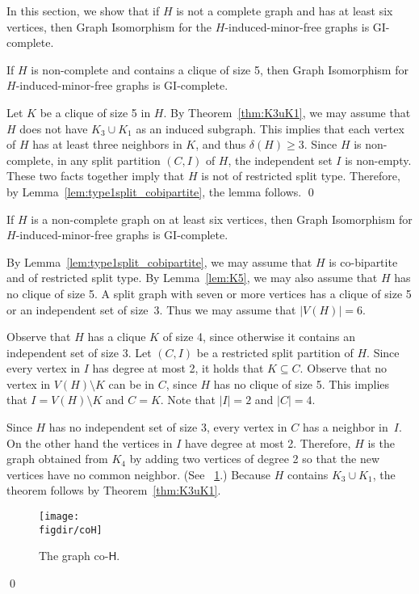 \documentclass[envcountsame,envcountsect,11pt,a4paper]{llncs}
\renewenvironment{proof}{\begin{Proof}}{\qed\end{Proof}}
\newcommand{\figref}[1]{\figurename~\ref{#1}}
\newcommand{\figdir}{.}
\begin{document}
In this section, we show that if $H$ is not a complete graph and has at least six vertices,
then {\sc Graph Isomorphism} for the $H$-induced-minor-free graphs is GI-complete.
\begin{lemma}
\label{lem:K5}
If $H$ is non-complete and contains a clique of size 5,
then {\sc Graph Isomorphism} for $H$-induced-minor-free graphs is GI-complete.
\end{lemma}
\begin{proof}
Let $K$ be a clique of size 5 in $H$.
By Theorem~\ref{thm:K3uK1}, we may assume that $H$ does not have $K_{3} \cup K_{1}$ as an induced subgraph.
This implies that each vertex of $H$ has at least three neighbors in $K$, and thus $\delta(H) \ge 3$.
Since $H$ is non-complete, in any split partition $(C, I)$ of $H$, the independent set $I$  is non-empty.
These two facts together imply that $H$ is not of restricted split type.
Therefore, by Lemma~\ref{lem:type1split_cobipartite}, the lemma follows.
\end{proof}

\begin{theorem}
If $H$ is a non-complete graph on at least six vertices,
then {\sc Graph Isomorphism} for $H$-induced-minor-free graphs is GI-complete.
\end{theorem}
\begin{proof}
By Lemma~\ref{lem:type1split_cobipartite},
we may assume that $H$ is co-bipartite and of restricted split type.
By Lemma~\ref{lem:K5}, we may also assume that $H$ has no clique of size 5.
A split graph with seven or more vertices has a clique of size 5 or an independent set of size~3.
Thus we may assume that $|V(H)| = 6$.

Observe that $H$ has a clique $K$ of size 4,
since otherwise it contains an independent set of size 3.
Let $(C, I)$ be a restricted split partition of $H$.
Since every vertex in $I$ has degree at most 2, it holds that $K \subseteq C$.
Observe that no vertex in $V(H) \setminus K$ can be in $C$, since $H$ has no clique of size 5. 
This implies that $I = V(H) \setminus K$ and $C = K$. Note that $|I| = 2$ and $|C| = 4$.

Since $H$ has no independent set of size 3,
every vertex in $C$ has a neighbor in~$I$.
On the other hand the vertices in $I$ have degree at most 2.
Therefore, $H$ is the graph obtained from $K_{4}$ by adding two vertices of degree 2
so that the new vertices have no common neighbor. (See \figref{fig:coH}.)
Because $H$ contains $K_{3} \cup K_{1}$, the theorem follows by Theorem~\ref{thm:K3uK1}.
\begin{figure}[htb]
  \centering
  \texttt{[image: \\figdir/coH]}
  \caption{The graph co-$\mathsf{H}$.}
  \label{fig:coH}
\end{figure}
\end{proof}
\end{document}
